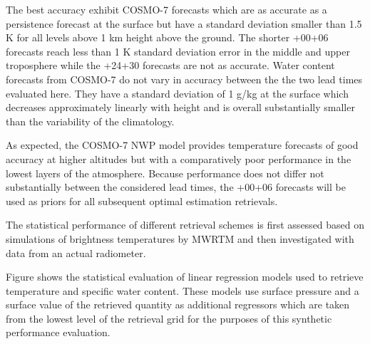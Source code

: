     The best accuracy exhibit COSMO-7 forecasts which are as accurate as
    a persistence forecast at the surface but have a standard deviation smaller
    than 1.5 K for all levels above 1 km height above the ground. The shorter
    +00+06 forecasts reach less than 1 K standard deviation error in the middle
    and upper troposphere while the +24+30 forecasts are not as accurate.
    Water content forecasts from COSMO-7 do not vary in accuracy between the
    the two lead times evaluated here. They have a standard deviation of 1 g/kg
    at the surface which decreases approximately linearly with height and is
    overall substantially smaller than the variability of the climatology.

    As expected, the COSMO-7 NWP model provides temperature forecasts of good
    accuracy at higher altitudes but with a comparatively poor performance in
    the lowest layers of the atmosphere. Because performance does not differ
    not substantially between the considered lead times, the +00+06 forecasts
    will be used as priors for all subsequent optimal estimation retrievals.

        {}

\stopsection


\startsection[title={Statistical Retrieval Performance}]

    The statistical performance of different retrieval schemes is first
    assessed based on simulations of brightness temperatures by MWRTM and then
    investigated with data from an actual radiometer.

\startsubsection[title={Linear Regression Retrievals}]

    Figure  shows the statistical evaluation of linear
    regression models used to retrieve temperature and specific water content.
    These models use surface pressure and a surface value of the retrieved
    quantity as additional regressors which are taken from the lowest
    level of the retrieval grid for the purposes of this synthetic performance
    evaluation.

